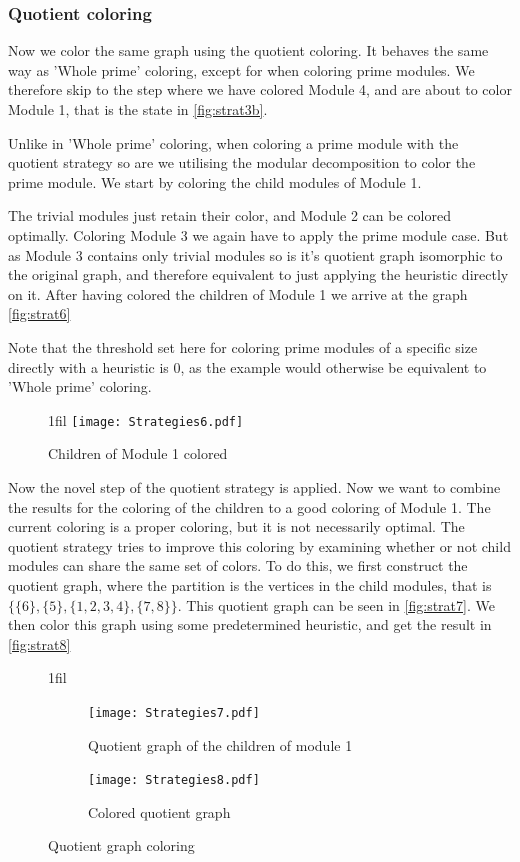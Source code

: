 \documentclass[a4paper]{article}
\makeatletter
\newcommand*{\centerfloat}{%
  \parindent \z@
  \leftskip \z@ \@plus 1fil \@minus \textwidth
  \rightskip\leftskip
  \parfillskip \z@skip}
\makeatother
\begin{document}
\subsubsection{Quotient coloring}
Now we color the same graph using the quotient coloring. It behaves the same way
as 'Whole prime' coloring, except for when coloring prime modules. We therefore
skip to the step where we have colored Module 4, and are about to color 
Module 1, that is the state in \autoref{fig:strat3b}.

Unlike in 'Whole prime' coloring, when coloring a prime module with the quotient
strategy so are we utilising the modular decomposition to color the prime
module. We start by coloring the child modules of Module 1.

The trivial modules just retain their color, and Module 2 can be colored
optimally. Coloring Module 3 we again have to apply the prime module case. But as
Module 3 contains only trivial modules so is it's quotient graph isomorphic to
the original graph, and therefore equivalent to just applying the heuristic
directly on it. After having colored the children of Module 1 we arrive at the
graph \autoref{fig:strat6}

Note that the threshold set here for coloring prime modules of a specific size
directly with a heuristic is 0, as the example would otherwise be equivalent to
'Whole prime' coloring. 

\begin{figure}[H]
    \centerfloat
    \texttt{[image: Strategies6.pdf]}
    \caption{Children of Module 1 colored}
    \label{fig:strat6}
\end{figure}

Now the novel step of the quotient strategy is applied. Now we want to combine
the results for the coloring of the children to a good coloring of Module 1.
The current coloring is a proper coloring, but it is not necessarily optimal. The
quotient strategy tries to improve this coloring by examining whether or not
child modules can share the same set of colors. To do this, we first construct
the quotient graph, where the partition is the vertices in the child modules,
that is $\{\{6\},\{5\},\{1,2,3,4\},\{7,8\}\}$. This quotient graph can be seen
in \autoref{fig:strat7}. We then color this graph using some predetermined
heuristic, and get the result in \autoref{fig:strat8}

\begin{figure}[H]
\centerfloat
    \begin{subfigure}{.4\textwidth}
        \texttt{[image: Strategies7.pdf]}
      \caption{Quotient graph of the children of module 1}
      \label{fig:strat7}
    \end{subfigure}%
    \begin{subfigure}{.4\textwidth}
        \texttt{[image: Strategies8.pdf]}
      \caption{Colored quotient graph}
      \label{fig:strat8}
    \end{subfigure}

    \caption{Quotient graph coloring}
\end{figure}
\end{document}
